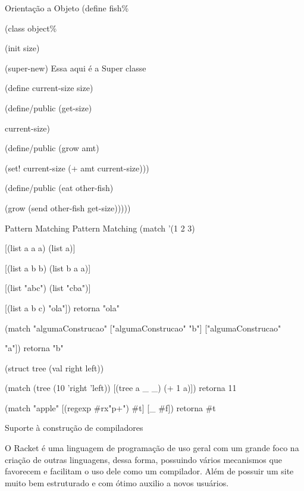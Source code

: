 \documentclass{beamer}
\begin{document}
\begin{frame}{Orientação a Objeto}
(define fish\%

  (class object\%
  
    (init size) 
    
    (super-new) Essa aqui é a Super classe
    
    (define current-size size)
    
    (define/public (get-size)
    
      current-size)
      
    (define/public (grow amt)
    
      (set! current-size (+ amt current-size)))
      
    (define/public (eat other-fish)
    
      (grow (send other-fish get-size)))))


\end{frame}


\begin{frame}[fragile]{Pattern Matching}
Pattern Matching
(match '(1 2 3)

[(list a a a) (list a)]

[(list a b b) (list b a a)]

[(list "abc") (list "cba")]

[(list a b c) "ola"]) retorna "ola"

(match "algumaConstrucao" ["algumaConstrucao" "b"] ["algumaConstrucao" 

"a"]) retorna "b"

(struct tree (val right left))

(match (tree (10 'right 'left)) [(tree a \_ \_) (+ 1 a)]) retorna 11

(match "apple" [(regexp \#rx"p+") \#t] [\_ \#f])  retorna \#t
\end{frame}


\begin{frame}[fragile]{Suporte à construção de compiladores}

O Racket é uma linguagem de programação de uso geral com um grande foco na criação de outras linguagens, dessa forma, possuindo vários mecanismos que favorecem e facilitam o uso dele como um compilador. 
Além de possuir um site muito bem estruturado e com ótimo auxilio a novos usuários.

\end{frame}
\end{document}

